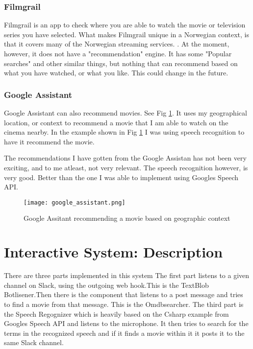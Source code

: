 \documentclass[11pt,fleqn]{book} %
\begin{document}
\subsection{Filmgrail}
Filmgrail is an app to check where you are able to watch the movie or television series you have selected. What makes Filmgrail unique in a Norwegian context, is that it covers many of the Norwegian streaming services. \cite{AmundsenAppenAftenposten}.
At the moment, however, it does not have a "recommendation" engine. It has some "Popular searches" and other similar things, but nothing that can recommend based on what you have watched, or what you like. This could change in the future.
\subsection{Google Assistant}
Google Assistant can also recommend movies. See Fig \ref{fig:google_assistant}. It uses my geographical location, or context to recommend a movie that I am able to watch on the cinema nearby. In the example shown in Fig \ref{fig:google_assistant} I was using speech recognition to have it recommend the movie.

The recommendations I have gotten from the Google Assistan has not been very exciting, and to me atleast, not very relevant. The speech recognition however, is very good. Better than the one I was able to implement using Googles Speech API.

\begin{figure}[]
  \centering
   \texttt{[image: google\_assistant.png]}
  \caption{Google Assitant recommending a movie based on geographic context}
  \label{fig:google_assistant}
\end{figure}



\chapter{Interactive System: Description}
There are three parts implemented in this system
The first part listens to a given channel on Slack, using the outgoing web hook\cite{SlackOutgoingSlack}.This is the TextBlob Botlisener.Then there is the component that listens to a post message and tries to find a movie from that message. This is the Omdbsearcher.
The third part is the Speech Regognizer which is heavily based on the Csharp example from Googles Speech API \cite{GoogleCloudPlatformSpeechPlatform} and listens to the microphone. It then tries to search for the terms in the recognized speech and if it finds a movie within it it posts it to the same Slack channel.
\end{document}
